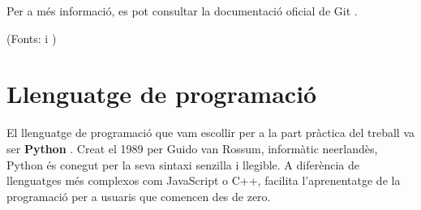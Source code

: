 \begin{enumerate}

Per a més informació, es pot consultar la documentació oficial de Git \cite{PaginaoficialdelGit}.
\end{enumerate}
(Fonts:\cite{Comparacionsentrecontroldeversions} i \cite{blocdecriticad'undesenvolupador})

\section{Llenguatge de programació}\label{sec:4.4}

El llenguatge de programació \cite{LlenguatgeDeProgramació} que vam escollir per a la part pràctica del treball va ser \textbf{Python} \cite{Python}. Creat el 1989 per Guido van Rossum, informàtic neerlandès, Python és conegut per la seva sintaxi senzilla i llegible. A diferència de llenguatges més complexos com JavaScript o C++, facilita l’aprenentatge de la programació per a usuaris que comencen des de zero.


